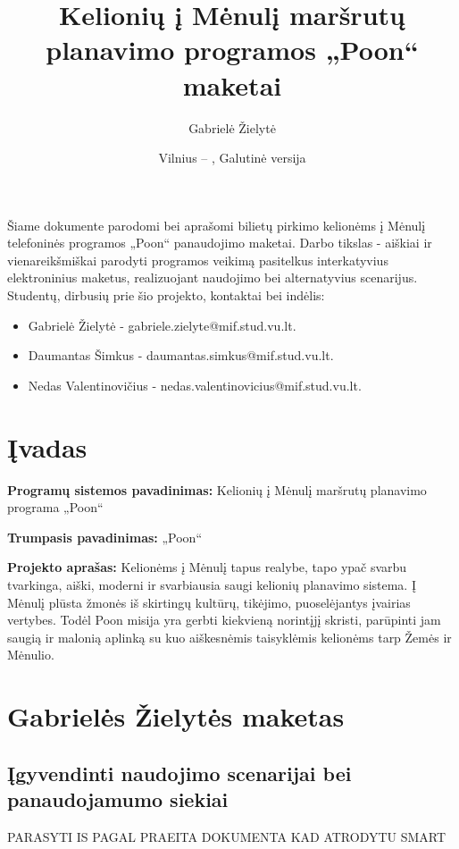 \documentclass{VUMIFPSkursinis}
\title{Kelionių į Mėnulį maršrutų planavimo programos „Poon“ maketai}
\author{Gabrielė Žielytė}
\date{Vilnius – \the\year, Galutinė versija}
\begin{document}
	
\maketitle


Šiame dokumente parodomi bei aprašomi bilietų pirkimo kelionėms į Mėnulį telefoninės programos „Poon“ panaudojimo maketai. Darbo tikslas - aiškiai ir vienareikšmiškai parodyti programos veikimą pasitelkus interkatyvius elektroninius maketus, realizuojant naudojimo bei alternatyvius scenarijus. Studentų, dirbusių prie šio projekto, kontaktai bei indėlis:
\begin{itemize}
\item Gabrielė Žielytė - gabriele.zielyte@mif.stud.vu.lt. 
\item Daumantas Šimkus - daumantas.simkus@mif.stud.vu.lt. 
\item Nedas Valentinovičius - nedas.valentinovicius@mif.stud.vu.lt. 
\end{itemize}
\thispagestyle{empty}

\thispagestyle{empty}
\tableofcontents

\cleardoublepage{}
\setcounter{page}{4}

\section{Įvadas}
\textbf{Programų sistemos pavadinimas: } Kelionių į Mėnulį maršrutų planavimo programa „Poon“
\bigskip

\textbf{Trumpasis pavadinimas: } „Poon“
\bigskip




\textbf{Projekto aprašas: } Kelionėms į Mėnulį tapus realybe, tapo ypač svarbu tvarkinga, aiški, moderni ir svarbiausia saugi kelionių planavimo sistema. Į Mėnulį plūsta žmonės iš skirtingų kultūrų, tikėjimo, puoselėjantys įvairias vertybes. Todėl Poon misija yra gerbti kiekvieną norintįjį skristi, parūpinti jam saugią ir malonią aplinką su kuo aiškesnėmis taisyklėmis kelionėms tarp Žemės ir Mėnulio.

\section{Gabrielės Žielytės maketas}
\subsection{Įgyvendinti naudojimo scenarijai bei panaudojamumo siekiai}
PARASYTI IS PAGAL PRAEITA DOKUMENTA KAD ATRODYTU SMART
\end{document}
